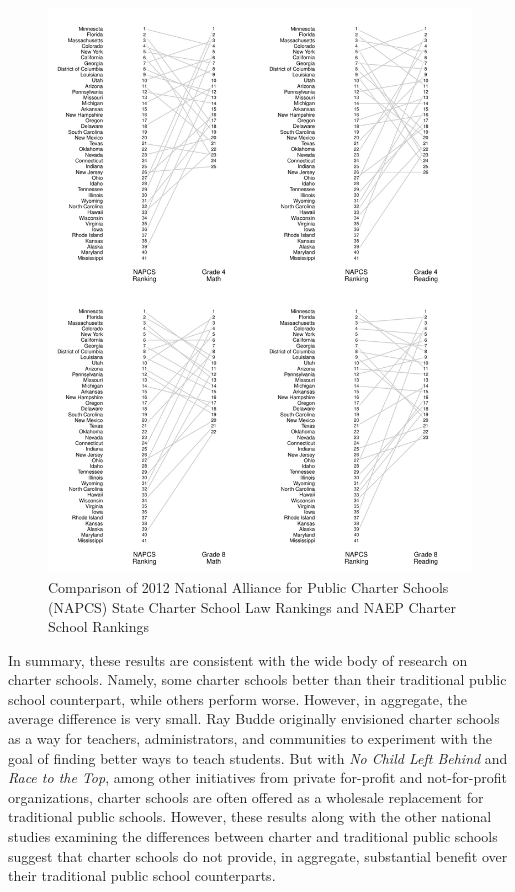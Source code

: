 \documentclass[letterpaper,12p,twoside]{article} %
\begin{document}
\begin{figure}[t]
\begin{center}
\includegraphics[width=\textwidth]{../Figures2009/StateRankings.pdf}
\caption{Comparison of 2012 National Alliance for Public Charter Schools (NAPCS) State Charter School Law Rankings and NAEP Charter School Rankings}
\label{fig:staterankings}
\end{center}
\end{figure}

In summary, these results are consistent with the wide body of research on charter schools. Namely, some charter schools better than their traditional public school counterpart, while others perform worse. However, in aggregate, the average difference is very small. Ray Budde originally envisioned charter schools as a way for teachers, administrators, and communities to experiment with the goal of finding better ways to teach students. But with \textit{No Child Left Behind} and \textit{Race to the Top}, among other initiatives from private for-profit and not-for-profit organizations, charter schools are often offered as a wholesale replacement for traditional public schools. However, these results along with the other national studies examining the differences between charter and traditional public schools suggest that charter schools do not provide, in aggregate, substantial benefit over their traditional public school counterparts.
\end{document}
